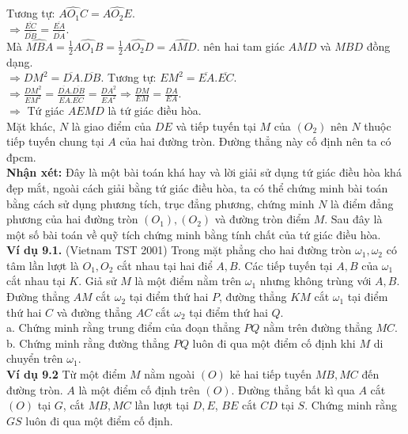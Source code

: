 \documentclass[12pt,a4paper]{article}
\begin{document}
Tương tự: \(\widehat {A{O_1}C} = \widehat {A{O_2}E}.\)\\
\( \Rightarrow \frac{{\overline {EC} }}{{\overline {DB} }} = \frac{{\overline {EA} }}{{\overline {DA} }}\).\\
Mà \(\widehat {MBA} = \frac{1}{2}\widehat {A{O_1}B} = \frac{1}{2}\widehat {A{O_2}D} = \widehat {AMD}.\) nên hai tam giác \(AMD\) và \(MBD\) đồng dạng.\\
\( \Rightarrow D{M^2} = \overline {DA} .\overline {DB} \). Tương tự: \(E{M^2} = \overline {EA} .\overline {EC} .\)\\
\( \Rightarrow \frac{{D{M^2}}}{{E{M^2}}} = \frac{{\overline {DA} .\overline {DB} }}{{\overline {EA} .\overline {EC} }} = \frac{{D{A^2}}}{{E{A^2}}} \Rightarrow \frac{{DM}}{{EM}} = \frac{{DA}}{{EA}}.\)\\
\( \Rightarrow \) Tứ giác \(AEMD\) là tứ giác điều hòa.\\
Mặt khác, \(N\) là giao điểm của \(DE\) và tiếp tuyến tại \(M\) của  \(\left( {{O_2}} \right)\) nên \(N\) thuộc tiếp tuyến chung tại \(A\) của hai đường tròn. Đường thẳng này cố định nên ta có đpcm.\\
\textbf{Nhận xét:} Đây là một bài toán khá hay và lời giải sử dụng tứ giác điều hòa khá đẹp mắt, ngoài cách giải bằng tứ giác điều hòa, ta có thể chứng minh bài toán bằng cách sử dụng phương tích, trục đẳng phương, chứng minh \(N\) là điểm đẳng phương của hai đường tròn \(\left( {{O_1}} \right),\left( {{O_2}} \right)\) và đường tròn điểm \(M\). Sau đây là một số bài toán về quỹ tích chứng minh bằng tính chất của tứ giác điều hòa.\\
\textbf{Ví dụ 9.1.} (Vietnam TST 2001) Trong mặt phẳng cho hai đường tròn \({\omega _1},{\omega _2}\) có tâm lần lượt là \({O_1},{O_2}\) cắt nhau tại hai điể \(A, B\). Các tiếp tuyến tại \(A, B\) của \({\omega _1}\) cắt nhau tại \(K\). Giả sử \(M\) là một điểm nằm trên \({\omega _1}\) nhưng không trùng với \(A, B\). Đường thẳng \(AM\) cắt \({\omega _2}\) tại điểm thứ hai \(P\), đường thẳng \(KM\) cắt \({\omega _1}\) tại điểm thứ hai \(C\) và đường thẳng \(AC\) cắt \({\omega _2}\) tại điểm thứ hai \(Q\).\\
a. Chứng minh rằng trung điểm của đoạn thẳng \(PQ\) nằm trên đường thẳng \(MC\).\\
b. Chứng minh rằng đường thẳng \(PQ\) luôn đi qua một điểm cố định khi \(M\) di chuyển trên \({\omega _1}\). \\
\textbf{Ví dụ 9.2} Từ một điểm \(M\) nằm ngoài \(\left( O \right)\) kẻ hai tiếp tuyến \(MB, MC\) đến đường tròn. \(A\) là một điểm cố định trên \(\left( O \right)\). Đường thẳng bất kì qua \(A\) cắt \(\left( O \right)\) tại \(G\), cắt \(MB, MC\) lần lượt tại \(D, E\), \(BE\) cắt \(CD\) tại \(S\). Chứng minh rằng \(GS\) luôn đi qua một điểm cố định. \\
\end{document}
